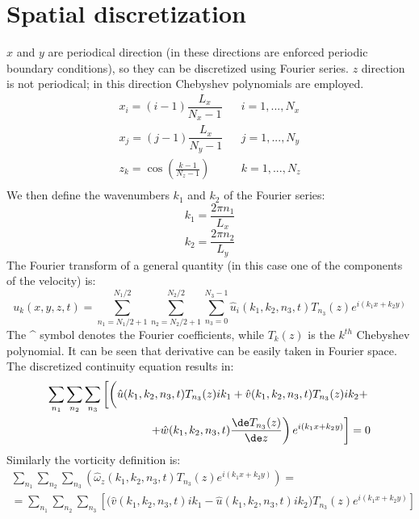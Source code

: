 \section{Spatial discretization}
$x$ and $y$ are periodical direction (in these directions are enforced periodic boundary conditions), so they can be discretized using Fourier series. $z$ direction is not periodical; in this direction Chebyshev polynomials are employed.\\
\renewcommand\arraystretch{1.5}
\[
\begin{array}{lccl}
x_i=(i-1)\dfrac{L_x}{N_x-1} & & i=1,...,N_x\\
x_j=(j-1)\dfrac{L_x}{N_y-1} & & j=1,...,N_y\\
z_k=\cos\left(\frac{k-1}{N_z-1}\right) && k=1,...,N_z\\
\end{array}
\]
\renewcommand\arraystretch{1}
We then define the wavenumbers $k_1$ and $k_2$ of the Fourier series:
\[
k_1=\frac{2\pi n_1}{L_x}
\]
\[
k_2=\frac{2\pi n_2}{L_y}
\]
The Fourier transform of a general quantity (in this case one of the components of the velocity) is:
\[
u_k(x,y,z,t)=\sum_{n_1=N_1/2+1}^{N_1/2}\sum_{n_2=N_2/2+1}^{N_2/2}\sum_{n_3=0}^{N_3-1}\hat u_i(k_1,k_2,n_3,t)T_{n_3}(z)e^{i(k_1x+k_2y)}
\]
The \string^ symbol denotes the Fourier coefficients, while $T_k(z)$ is the $k^{th}$ Chebyshev polynomial. It can be seen that derivative can be easily taken in Fourier space.\\
The discretized continuity equation results in:
\begin{equation}
\begin{split}
\sum_{n_1}\sum_{n_2}\sum_{n_3}\left[ \left(\vphantom{\frac{\de T_{n_3}(z)}{\de z}}\hat u(k_1,k_2,n_3,t)T_{n_3}(z)ik_1+\hat v(k_1,k_2,n_3,t)T_{n_3}(z)ik_2+\right .\right . \\
\left .\left . +\hat w(k_1,k_2,n_3,t)\frac{\de T_{n_3}(z)}{\de z}\right) e^{i(k_1x+k_2y)} \right]=0
\end{split}
\end{equation}
Similarly the vorticity definition is:
\begin{equation}
\begin{split}
\sum_{n_1}\sum_{n_2}\sum_{n_3}\left(\hat\omega_z(k_1,k_2,n_3,t)T_{n_3}(z)e^{i(k_1x+k_2y)}  \right)=\\
=\sum_{n_1}\sum_{n_2}\sum_{n_3}\left[\Big(\hat v(k_1,k_2,n_3,t)ik_1-\hat u(k_1,k_2,n_3,t)ik_2\Big)T_{n_3}(z)e^{i(k_1x+k_2y)}  \right]
\end{split}
\end{equation}
